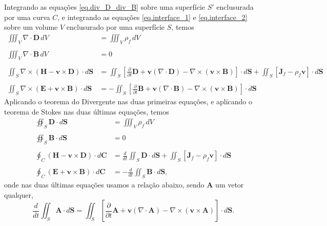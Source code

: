 Integrando as equa\c{c}\~oes \ref{eq.div_D_div_B} sobre uma superf\'icie $S'$ enclusurada por uma curva $C$, e integrando as equa\c{c}\~oes \ref{eq.interface_1} e \ref{eq.interface_2} sobre um volume $V$ enclusurado por uma superf\'icie $S$, temos
\begin{align*}
\iiint_V\nabla\cdot\mathbf{D}\,dV&=\iiint_V\rho_f\,dV\\\\
\iiint_V\nabla\cdot\mathbf{B}\,dV&=0\\\\
\iint_S\nabla\times(\mathbf{H}-\mathbf{v}\times\mathbf{D})\cdot d\mathbf{S}&=\iint_S\left[\frac{\partial}{\partial t}\mathbf{D}+\mathbf{v}(\nabla\cdot\mathbf{D})-\nabla\times(\mathbf{v}\times\mathbf{B})\right]\cdot d\mathbf{S}+\iint_S\left[\mathbf{J}_f-\rho_f\mathbf{v}\right]\cdot d\mathbf{S}\\\\
\iint_S\nabla\times(\mathbf{E}+\mathbf{v}\times\mathbf{B})\cdot d\mathbf{S}&=-\iint_S\left[\frac{\partial}{\partial t}\mathbf{B}+\mathbf{v}(\nabla\cdot\mathbf{B})-\nabla\times(\mathbf{v}\times\mathbf{B})\right]\cdot d\mathbf{S}
\end{align*}
Aplicando o teorema do Divergente nas duas primeiras equa\c{c}\~oes, e aplicando o teorema de Stokes nas duas \'ultimas equa\c{c}\~oes, temos
\begin{align}\label{eq.interface_3}
\oiint_S\mathbf{D}\cdot d\mathbf{S}&=\iiint_V\rho_f\,dV\\\nonumber\\\label{eq.interface_4}
\oiint_S\mathbf{B}\cdot d\mathbf{S}&=0\\\nonumber\\\label{eq.interface_5}
\oint_C(\mathbf{H}-\mathbf{v}\times\mathbf{D})\cdot d\mathbf{C}&=\frac{d}{dt}\iint_S\mathbf{D}\cdot d\mathbf{S}+\iint_S\left[\mathbf{J}_f-\rho_f\mathbf{v}\right]\cdot d\mathbf{S}\\\nonumber\\\label{eq.interface_6}
\oint_C(\mathbf{E}+\mathbf{v}\times\mathbf{B})\cdot d\mathbf{C}&=-\frac{d}{dt}\iint_S\mathbf{B}\cdot d\mathbf{S},
\end{align} 
onde nas duas \'ultimas equa\c{c}\~oes usamos a rela\c{c}\~ao abaixo, sendo $\mathbf{A}$ um vetor qualquer,
\begin{equation*}
\frac{d}{dt}\iint_S\mathbf{A}\cdot d\mathbf{S}=\iint_S\left[\frac{\partial}{\partial t}\mathbf{A}+\mathbf{v}(\nabla\cdot\mathbf{A})-\nabla\times(\mathbf{v}\times\mathbf{A})\right]\cdot d\mathbf{S}.
\end{equation*}
